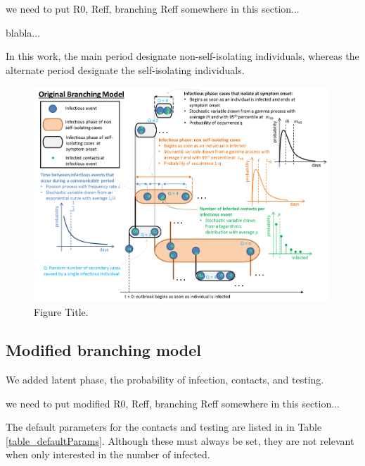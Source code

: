 \documentclass[sr]{drdc-report}
\begin{document}
we need to put R0, Reff, branching Reff somewhere in this section... 

blabla...

In this work, the main period designate non-self-isolating individuals, whereas the alternate period designate the self-isolating individuals. 

\begin{figure}
  \includegraphics[width=0.99\textwidth, keepaspectratio=true]{figures/BranchingModel}
  \caption{Figure Title.}\label{fig_branchingModel}
\end{figure}


\subsection{Modified branching model}
We added latent phase, the probability of infection, contacts, and testing. 

we need to put modified R0, Reff, branching Reff somewhere in this section... 

The default parameters for the contacts and testing are listed in in Table \ref{table_defaultParams}. Although these must always be set, they are not relevant when only interested in the number of infected. 
\end{document}
